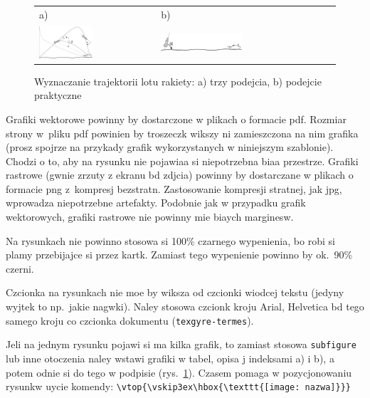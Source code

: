 \begin{figure}[htb]
  \centering
	\begin{tabular}{@{}ll@{}}
	a) & b) \\
  \includegraphics[width=0.475\textwidth]{rys05/beta1} & 
	\includegraphics[width=0.475\textwidth]{rys05/alfa1}
	\end{tabular}
  \caption{Wyznaczanie trajektorii lotu rakiety: a) trzy podejcia, b) podejcie praktyczne}
  \label{fig:alfabeta}
\end{figure}

Grafiki wektorowe powinny by dostarczone w plikach o formacie pdf. Rozmiar strony w~pliku pdf powinien by troszeczk wikszy ni zamieszczona na nim grafika (prosz spojrze na przykady grafik wykorzystanych w niniejszym szablonie). Chodzi o to, aby na rysunku nie pojawiaa si niepotrzebna biaa przestrze. Grafiki rastrowe (gwnie zrzuty z ekranu bd zdjcia) powinny by dostarczane w plikach o formacie png z~kompresj bezstratn. Zastosowanie kompresji stratnej, jak jpg, wprowadza niepotrzebne artefakty. Podobnie jak w przypadku grafik wektorowych, grafiki rastrowe nie powinny mie biaych marginesw.

Na rysunkach nie powinno stosowa si 100\% czarnego wypenienia, bo robi si plamy przebijajce si przez kartk. Zamiast tego wypenienie powinno by ok.\ 90\% czerni.

Czcionka na rysunkach nie moe by wiksza od czcionki wiodcej tekstu (jedyny wyjtek to np.\ jakie nagwki).
Naley stosowa czcionk kroju Arial, Helvetica bd tego samego kroju co czcionka dokumentu (\texttt{texgyre-termes}). 

Jeli na jednym rysunku pojawi si ma kilka grafik, to zamiast stosowa \texttt{subfigure} lub inne otoczenia naley wstawi grafiki w tabel, opisa j indeksami a) i b), a potem odnie si do tego w podpisie (rys.~\ref{fig:alfabeta}).
Czasem pomaga w pozycjonowaniu rysunkw uycie komendy:
\verb+\vtop{\vskip3ex\hbox{\texttt{[image: nazwa]}}}+

